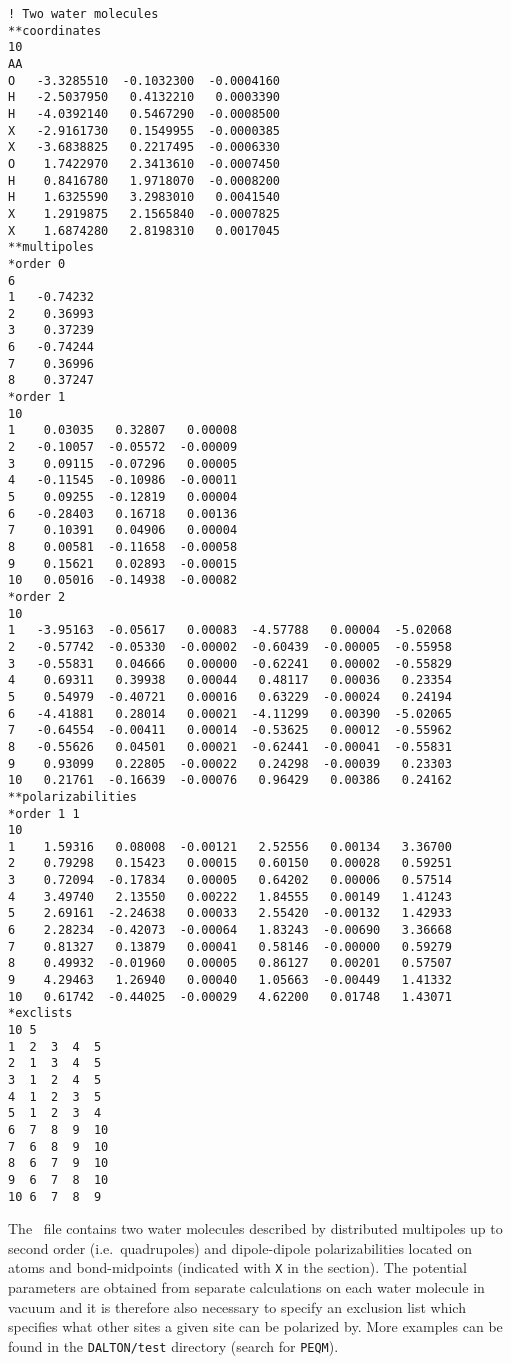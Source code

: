 \begin{verbatim}
! Two water molecules
**coordinates
10
AA
O   -3.3285510  -0.1032300  -0.0004160
H   -2.5037950   0.4132210   0.0003390
H   -4.0392140   0.5467290  -0.0008500
X   -2.9161730   0.1549955  -0.0000385
X   -3.6838825   0.2217495  -0.0006330
O    1.7422970   2.3413610  -0.0007450
H    0.8416780   1.9718070  -0.0008200
H    1.6325590   3.2983010   0.0041540
X    1.2919875   2.1565840  -0.0007825
X    1.6874280   2.8198310   0.0017045
**multipoles
*order 0
6
1   -0.74232
2    0.36993
3    0.37239
6   -0.74244
7    0.36996
8    0.37247
*order 1
10
1    0.03035   0.32807   0.00008
2   -0.10057  -0.05572  -0.00009
3    0.09115  -0.07296   0.00005
4   -0.11545  -0.10986  -0.00011
5    0.09255  -0.12819   0.00004
6   -0.28403   0.16718   0.00136
7    0.10391   0.04906   0.00004
8    0.00581  -0.11658  -0.00058
9    0.15621   0.02893  -0.00015
10   0.05016  -0.14938  -0.00082
*order 2
10
1   -3.95163  -0.05617   0.00083  -4.57788   0.00004  -5.02068
2   -0.57742  -0.05330  -0.00002  -0.60439  -0.00005  -0.55958
3   -0.55831   0.04666   0.00000  -0.62241   0.00002  -0.55829
4    0.69311   0.39938   0.00044   0.48117   0.00036   0.23354
5    0.54979  -0.40721   0.00016   0.63229  -0.00024   0.24194
6   -4.41881   0.28014   0.00021  -4.11299   0.00390  -5.02065
7   -0.64554  -0.00411   0.00014  -0.53625   0.00012  -0.55962
8   -0.55626   0.04501   0.00021  -0.62441  -0.00041  -0.55831
9    0.93099   0.22805  -0.00022   0.24298  -0.00039   0.23303
10   0.21761  -0.16639  -0.00076   0.96429   0.00386   0.24162
**polarizabilities
*order 1 1
10
1    1.59316   0.08008  -0.00121   2.52556   0.00134   3.36700
2    0.79298   0.15423   0.00015   0.60150   0.00028   0.59251
3    0.72094  -0.17834   0.00005   0.64202   0.00006   0.57514
4    3.49740   2.13550   0.00222   1.84555   0.00149   1.41243
5    2.69161  -2.24638   0.00033   2.55420  -0.00132   1.42933
6    2.28234  -0.42073  -0.00064   1.83243  -0.00690   3.36668
7    0.81327   0.13879   0.00041   0.58146  -0.00000   0.59279
8    0.49932  -0.01960   0.00005   0.86127   0.00201   0.57507
9    4.29463   1.26940   0.00040   1.05663  -0.00449   1.41332
10   0.61742  -0.44025  -0.00029   4.62200   0.01748   1.43071
*exclists
10 5
1  2  3  4  5
2  1  3  4  5
3  1  2  4  5
4  1  2  3  5
5  1  2  3  4
6  7  8  9  10
7  6  8  9  10
8  6  7  9  10
9  6  7  8  10
10 6  7  8  9
\end{verbatim}
The \potinp\ file contains two water molecules described by distributed 
multipoles up to second order (i.e.\ quadrupoles) and dipole-dipole polarizabilities
located on atoms and bond-midpoints (indicated with \verb|X| in the  
section). The potential parameters are obtained from separate calculations on each 
water molecule in vacuum and it is therefore also necessary to specify 
an exclusion list which specifies what other sites a given site can be polarized by.
More examples can be found in the \verb|DALTON/test| directory (search for 
\verb|PEQM|).

